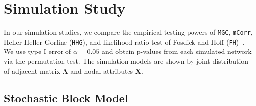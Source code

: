 \documentclass[11pt]{article}
\theoremstyle{definition}
\begin{document}
\section{Simulation Study}
\label{sec:simulation}
	\vspace*{-0.2cm}
In our simulation studies, we compare the empirical testing powers of \texttt{MGC}, \texttt{mCorr}, Heller-Heller-Gorfine (\texttt{HHG}), and likelihood ratio test of Fosdick and Hoff (\texttt{FH})~\citep{fosdick2015testing}. We use type I error of $\alpha = 0.05$ and obtain p-values from each simulated network via the permutation test. The simulation models are shown by joint distribution of adjacent matrix $\mathbf{A}$ and nodal attributes $\mathbf{X}$. %

\subsection{Stochastic Block Model}
\end{document}
